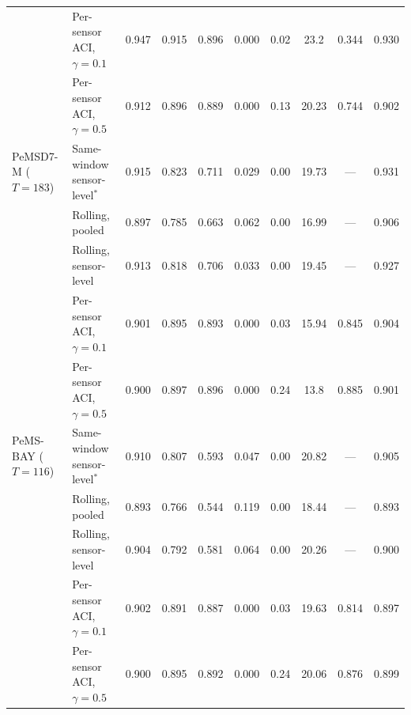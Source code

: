 \begin{table}[htbp]
\begin{tabular}{llcccccccc}
 & Per-sensor ACI, $\gamma=0.1$ & 0.947 & 0.915 & 0.896 & 0.000 & 0.02 & 23.2 & 0.344 & 0.930 \\
 & Per-sensor ACI, $\gamma=0.5$ & 0.912 & 0.896 & 0.889 & 0.000 & 0.13 & 20.23 & 0.744 & 0.902 \\
\midrule
PeMSD7-M ($T=183$) & Same-window sensor-level$^*$ & 0.915 & 0.823 & 0.711 & 0.029 & 0.00 & 19.73 & --- & 0.931 \\
 & Rolling, pooled & 0.897 & 0.785 & 0.663 & 0.062 & 0.00 & 16.99 & --- & 0.906 \\
 & Rolling, sensor-level & 0.913 & 0.818 & 0.706 & 0.033 & 0.00 & 19.45 & --- & 0.927 \\
 & Per-sensor ACI, $\gamma=0.1$ & 0.901 & 0.895 & 0.893 & 0.000 & 0.03 & 15.94 & 0.845 & 0.904 \\
 & Per-sensor ACI, $\gamma=0.5$ & 0.900 & 0.897 & 0.896 & 0.000 & 0.24 & 13.8 & 0.885 & 0.901 \\
\midrule
PeMS-BAY ($T=116$) & Same-window sensor-level$^*$ & 0.910 & 0.807 & 0.593 & 0.047 & 0.00 & 20.82 & --- & 0.905 \\
 & Rolling, pooled & 0.893 & 0.766 & 0.544 & 0.119 & 0.00 & 18.44 & --- & 0.893 \\
 & Rolling, sensor-level & 0.904 & 0.792 & 0.581 & 0.064 & 0.00 & 20.26 & --- & 0.900 \\
 & Per-sensor ACI, $\gamma=0.1$ & 0.902 & 0.891 & 0.887 & 0.000 & 0.03 & 19.63 & 0.814 & 0.897 \\
 & Per-sensor ACI, $\gamma=0.5$ & 0.900 & 0.895 & 0.892 & 0.000 & 0.24 & 20.06 & 0.876 & 0.899 \\
\bottomrule
\end{tabular}
\end{table}

